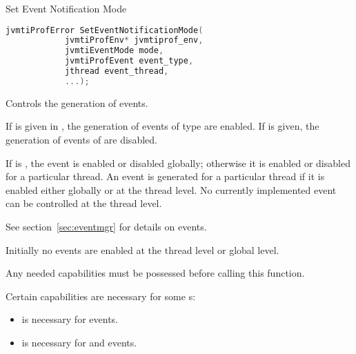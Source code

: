 \begin{apidef}{Set Event Notification Mode}
\begin{lstlisting}[language=C]
jvmtiProfError SetEventNotificationMode(
            jvmtiProfEnv* jvmtiprof_env,
            jvmtiEventMode mode,
            jvmtiProfEvent event_type,
            jthread event_thread,
            ...);
\end{lstlisting}

\begin{apidesc}
Controls the generation of events.

\medskip
If  is given in , the generation of events of type  are enabled. If  is given, the generation of events of  are disabled.

\medskip
If  is , the event is enabled or disabled globally; otherwise it is enabled or disabled for a particular thread. An event is generated for a particular thread if it is enabled either globally or at the thread level. No currently implemented event can be controlled at the thread level.

\medskip
See section~\ref{sec:eventmgr} for details on events.

\medskip
Initially no events are enabled at the thread level or global level.

\medskip
Any needed capabilities must be possessed before calling this function.
\end{apidesc}

\begin{apiphase}
\apiphaseonloadlive
\end{apiphase}

\begin{apicap}
Certain capabilities are necessary for some s:
\begin{itemize}
\item {} is necessary for  events.
\item {} is necessary for  and  events.
\end{itemize}
\end{apicap}

\begin{apiparam}
\end{apiparam}


\end{apidef}
